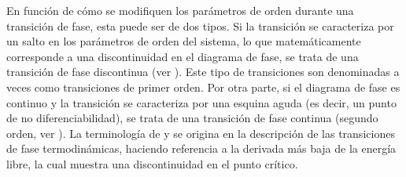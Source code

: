 En función de cómo se modifiquen los parámetros de orden durante una transición de fase, esta puede ser de dos tipos. Si la transición se caracteriza por un salto en los parámetros de orden del sistema, lo que matemáticamente corresponde a una discontinuidad en el diagrama de fase, se trata de una transición de fase discontinua (ver  ). Este tipo de transiciones son denominadas a veces como transiciones de primer orden. Por otra parte, si el diagrama de fase es continuo y la transición se caracteriza por una esquina aguda (es decir, un punto de no diferenciabilidad), se trata de una transición de fase continua (segundo orden, ver ). La terminología de  y  se origina en la descripción de las transiciones de fase termodinámicas, haciendo referencia a la derivada más baja de la energía libre, la cual muestra una discontinuidad en el punto crítico.


